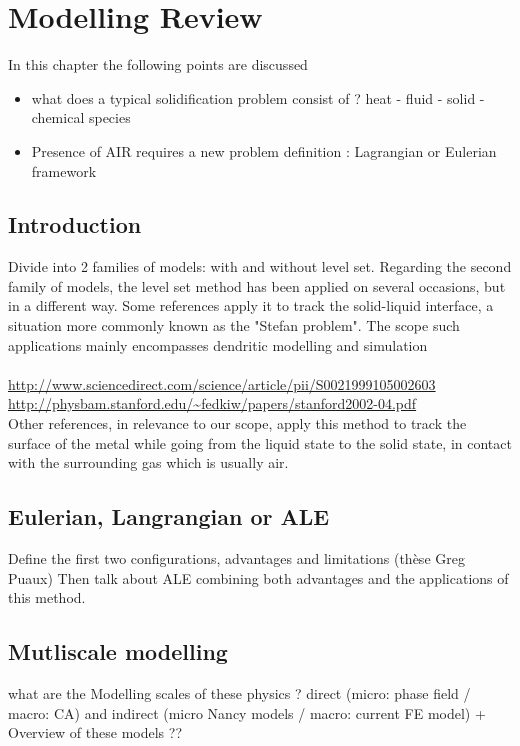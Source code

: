 \chapter{Modelling Review}
\begin{nolinkcolors} 
\minitoc
\end{nolinkcolors}
\newpage

In this chapter the following points are discussed
\begin{itemize}
\item what does a typical solidification problem consist of ? heat - fluid - solid 
- chemical species
\item Presence of AIR requires a new problem definition : Lagrangian or Eulerian framework
\end{itemize}

\section{Introduction}
Divide into 2 families of models: with and without level set. Regarding the second family of models,
the level set method has been applied on several occasions, but in a different way. Some references
apply it to track the solid-liquid interface, a situation more commonly known as the "Stefan problem".
The scope such applications mainly encompasses dendritic modelling and simulation \\
 \\
\url{http://www.sciencedirect.com/science/article/pii/S0021999105002603} \\
\url{http://physbam.stanford.edu/~fedkiw/papers/stanford2002-04.pdf} \\
Other references, in relevance to our scope, apply this method to track the surface of the metal
while going from the liquid state to the solid state, in contact with the surrounding gas which is usually air. \\

\section{Eulerian, Langrangian or ALE}
Define the first two configurations, advantages and limitations (thèse Greg Puaux)
Then talk about ALE combining both advantages and the applications of this method.

\section{Mutliscale modelling}
what are the Modelling scales of these physics ? direct (micro: phase field / macro: CA) 
and indirect (micro Nancy models / macro: current FE model) + Overview of these models ??


